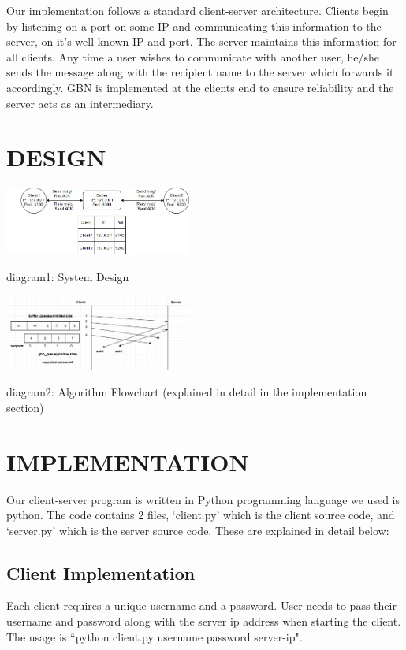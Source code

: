 \documentclass[10pt, pdftex, twocolumn]{report}
\begin{document}
	Our implementation follows a standard client-server architecture. Clients begin by listening on a port on some IP and communicating this information to the server, on it’s well known IP and port. The server maintains this information for all clients. Any time a user wishes to communicate with another user, he/she sends the message along with the recipient name to the server which forwards it accordingly. GBN is implemented at the clients end to ensure reliability and the server acts as an intermediary.
	
	
	
	\section*{DESIGN}
	\includegraphics*[width=0.46\textwidth]{system.jpg}
	
	diagram1: System Design
	
	\includegraphics*[width=0.46\textwidth]{algo.png}
	
	diagram2: Algorithm Flowchart (explained in detail in the implementation section)
	
	
	\section*{IMPLEMENTATION}
	Our client-server program is written in Python programming language we used is python. The code contains 2 files, ‘client.py’ which is the client source code, and ‘server.py’ which is the server source code. These are explained in detail below:
	
	\subsection*{Client Implementation}
	Each client requires a unique username and a password. User needs to pass their username and password along with the server ip address when starting the client. 
	The usage is “python client.py username password server-ip". 
	
\end{document}

